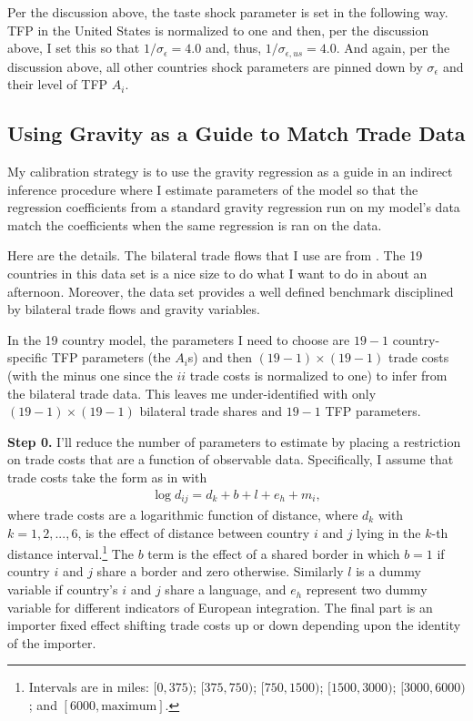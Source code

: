 \documentclass[12pt,pdftex]{article}
\begin{document}
\begin{onehalfspacing}
Per the discussion above, the taste shock parameter is set in the following way. TFP in the United States is normalized to one and then, per the discussion above, I set this so that $1 / \sigma_{\epsilon} = 4.0$ and, thus, $1 / \sigma_{\epsilon,us} = 4.0$. And again, per the discussion above, all other countries shock parameters are pinned down by $\sigma_{\epsilon}$ and their level of TFP $A_i$.



\subsection{Using Gravity as a Guide to Match Trade Data}

My calibration strategy is to use the gravity regression as a guide in an indirect inference procedure where I estimate parameters of the model so that the regression coefficients from a standard gravity regression run on my model's data match the coefficients when the same regression is ran on the data.

Here are the details. The bilateral trade flows that I use are from \citet{eaton2002technology}. The 19 countries in this data set is a nice size to do what I want to do in about an afternoon. Moreover, the \citet{eaton2002technology} data set provides a well defined benchmark disciplined by bilateral trade flows and gravity variables.

In the 19 country model, the parameters I need to choose are $19 - 1$ country-specific TFP parameters (the $A_i$s) and then $(19-1) \times (19-1)$ trade costs (with the minus one since the $ii$ trade costs is normalized to one) to infer from the bilateral trade data. This leaves me under-identified with  only $(19-1) \times (19-1)$ bilateral trade shares and $19 -1$ TFP parameters.

\textbf{Step 0.} I'll reduce the number of parameters to estimate by placing a restriction on trade costs that are a function of observable data. Specifically, I assume that trade costs take the form as in \citet{eaton2002technology} with
\begin{align}
\log d_{ij} = d_{k} + b + l + e_{h} + m_{i},
\label{eq:trade-cost-function}
\end{align}
where trade costs are a logarithmic function of distance, where $d_k$ with $k = 1,2,...,6$, is the effect of distance between country $i$ and $j$ lying in the $k$-th distance interval.\footnote{Intervals are in miles: $[0,375)$; $[375,750)$; $[750,1500)$; $[1500,3000)$; $[3000,6000)$; and $[6000,\mbox{maximum}]$. } The $b$ term is the effect of a shared border in which $b =1$ if country $i$ and $j$ share a border and zero otherwise. Similarly $l$ is a dummy variable if country's $i$ and $j$ share a language, and $e_{h}$ represent two dummy variable for different indicators of European integration. The final part is an importer fixed effect shifting trade costs up or down depending upon the identity of the importer.


\end{onehalfspacing}
\end{document}
